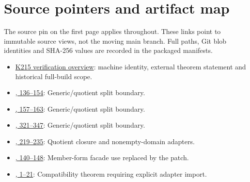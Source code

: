 \section{Source pointers and artifact map}
The source pin on the first page applies throughout. These links point to immutable source views, not the moving main branch. Full paths, Git blob identities and SHA-256 values are recorded in the packaged manifests.

\begin{itemize}
\item \href{https://github.com/VladimirReshetnikov/ProveIt/blob/cbf94cb552a3b49509e0eee80e7455d4eb5974c6/Computability/BusyBeaver/Research/ZFC/k225-formal/verification/k215/README.md}{K215 verification overview}: machine identity, external theorem statement and historical full-build scope.
\item \href{https://github.com/VladimirReshetnikov/ProveIt/blob/cbf94cb552a3b49509e0eee80e7455d4eb5974c6/Computability/BusyBeaver/Lean/BusyBeaver/ZFC/SingletonInfinity.lean#L136-L154}{, 136--154}: Generic/quotient split boundary.
\item \href{https://github.com/VladimirReshetnikov/ProveIt/blob/cbf94cb552a3b49509e0eee80e7455d4eb5974c6/Computability/BusyBeaver/Lean/BusyBeaver/ZFC/FiniteSets.lean#L157-L163}{, 157--163}: Generic/quotient split boundary.
\item \href{https://github.com/VladimirReshetnikov/ProveIt/blob/cbf94cb552a3b49509e0eee80e7455d4eb5974c6/Computability/BusyBeaver/Lean/BusyBeaver/ZFC/InductiveAttempts.lean#L321-L347}{, 321--347}: Generic/quotient split boundary.
\item \href{https://github.com/VladimirReshetnikov/ProveIt/blob/cbf94cb552a3b49509e0eee80e7455d4eb5974c6/Computability/BusyBeaver/Lean/BusyBeaver/ZFC/WellFoundedPart.lean#L219-L235}{, 219--235}: Quotient closure and nonempty-domain adapters.
\item \href{https://github.com/VladimirReshetnikov/ProveIt/blob/cbf94cb552a3b49509e0eee80e7455d4eb5974c6/Computability/BusyBeaver/Lean/BusyBeaver/ZFC/KLowerQHyp.lean#L140-L148}{, 140--148}: Member-form facade use replaced by the patch.
\item \href{https://github.com/VladimirReshetnikov/ProveIt/blob/cbf94cb552a3b49509e0eee80e7455d4eb5974c6/Computability/BusyBeaver/Lean/BusyBeaver/ZFC/WFModel.lean#L1-L21}{, 1--21}: Compatibility theorem requiring explicit adapter import.

\end{itemize}
